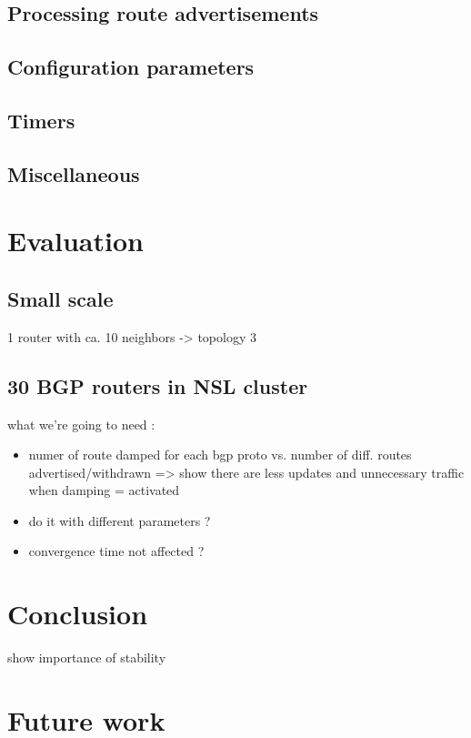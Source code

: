 \documentclass[a4paper,english]{IEEEtran}
\begin{document}
\subsection{Processing route advertisements}


\subsection{Configuration parameters}


\subsection{Timers}


\subsection{Miscellaneous}


\section{Evaluation}


\subsection{Small scale}

1 router with ca. 10 neighbors -> topology 3


\subsection{30 BGP routers in NSL cluster}

what we're going to need :
\begin{itemize}
\item numer of route damped for each bgp proto vs. number of diff. routes
advertised/withdrawn => show there are less updates and unnecessary
traffic when damping = activated
\item do it with different parameters ?
\item convergence time not affected ?
\end{itemize}

\section{Conclusion}

show importance of stability


\section{Future work}
\end{document}
